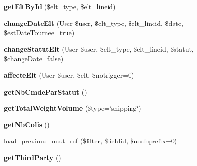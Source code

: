 \begin{DoxyCompactItemize}
{\bfseries get\+Elt\+By\+Id} (\$elt\+\_\+type, \$elt\+\_\+lineid)
\item 
\mbox{\label{classTourneeUnique__lines_a12baefe580c8492ab303c9d78626171b}} 
{\bfseries change\+Date\+Elt} (User \$user, \$elt\+\_\+type, \$elt\+\_\+lineid, \$date, \$est\+Date\+Tournee=true)
\item 
\mbox{\label{classTourneeUnique__lines_abac5fe2d2b68ac3f55451f38865cd1f0}} 
{\bfseries change\+Statut\+Elt} (User \$user, \$elt\+\_\+type, \$elt\+\_\+lineid, \$statut, \$change\+Date=false)
\item 
\mbox{\label{classTourneeUnique__lines_acffe80430f18582d3319de73d98d7b82}} 
{\bfseries affecte\+Elt} (User \$user, \$elt, \$notrigger=0)
\item 
\mbox{\label{classTourneeUnique__lines_a907d079f0694fa6417630c0a42108002}} 
{\bfseries get\+Nb\+Cmde\+Par\+Statut} ()
\item 
\mbox{\label{classTourneeUnique__lines_a0608782bf788644961453f6a8cdd39e1}} 
{\bfseries get\+Total\+Weight\+Volume} (\$type=\char`\"{}shipping\char`\"{})
\item 
\mbox{\label{classTourneeUnique__lines_a320d3a9fb8fe68979e4818a42bd90644}} 
{\bfseries get\+Nb\+Colis} ()
\item 
\hyperlink{classTourneeUnique__lines_a4bc3b587051c3bab79f2e9dab96b3cad}{load\+\_\+previous\+\_\+next\+\_\+ref} (\$filter, \$fieldid, \$nodbprefix=0)
\item 
\mbox{\label{classTourneeUnique__lines_a67ecbcb6d520323da23127c49b641bab}} 
{\bfseries get\+Third\+Party} ()
\end{DoxyCompactItemize}
